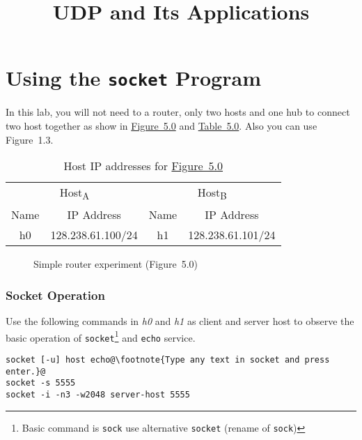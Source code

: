 \documentclass{../UTNetLab}
\title{UDP and Its Applications}
\begin{document}
\part{Using the \texttt{socket} Program}
\label{sec:schema}
    In this lab, you will not need to a router, only two hosts and one hub to connect two host together as show in \hyperref[fig:5.0]{Figure~5.0} and \hyperref[tab:5.0]{Table~5.0}.
    Also you can use Figure~1.3.
    \begin{table}[H]
        \caption{Host IP addresses for \hyperref[fig:5.0]{Figure~5.0}}
        \label{tab:5.0}
        \centering
        \begin{tabular}{ *2c|*2c }
            \hline \hline
            \multicolumn{2}{c|}{Host\textsubscript{A}} & \multicolumn{2}{c}{Host\textsubscript{B}} \\
            Name & IP Address & Name & IP Address \\
            \hline 
            h0 & 128.238.61.100/24 & h1 & 128.238.61.101/24\\
            \hline \hline
            \end{tabular}
    \end{table}

    \begin{figure}[H]
        \centering
        \caption{Simple router experiment (Figure~5.0)}        
        \label{fig:5.0}
    \end{figure}

\section{Socket Operation}
    Use the following commands in \textit{h0} and \textit{h1} as client and server host to observe the basic operation of \lstinline{socket}\footnote{Basic command is \lstinline{sock} use alternative \lstinline{socket} (rename of \lstinline{sock})} and \lstinline{echo} service.
    \begin{lstlisting}[emph={host, server-host}]
socket [-u] host echo@\footnote{Type any text in socket and press enter.}@
socket -s 5555
socket -i -n3 -w2048 server-host 5555
    \end{lstlisting}
\end{document}
